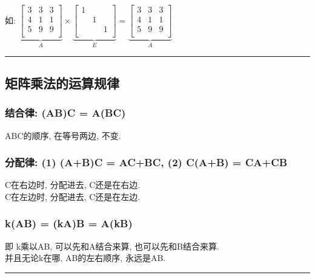 \documentclass[UTF8]{ctexart}
\begin{document}
如: $
\underset{A}{\underbrace{\left[ \begin{matrix}
			3&		3&		3\\
			4&		1&		1\\
			5&		9&		9\\
		\end{matrix} \right] }}×\underset{E}{\underbrace{\left[ \begin{matrix}
			1&		&		\\
			&		1&		\\
			&		&		1\\
		\end{matrix} \right] }}=\underset{A}{\underbrace{\left[ \begin{matrix}
			3&		3&		3\\
			4&		1&		1\\
			5&		9&		9\\
		\end{matrix} \right] }}
$\\

\hrule

\subsection{矩阵乘法的运算规律}

\subsubsection{结合律: (AB)C = A(BC)} 

ABC的顺序, 在等号两边, 不变.\\


\subsubsection{分配律: (1) (A+B)C = AC+BC,  (2) C(A+B) = CA+CB} 

C在右边时, 分配进去, C还是在右边. \\
C在左边时, 分配进去, C还是在左边. \\


\subsubsection{ k(AB) = (kA)B = A(kB)} 

即 k乘以AB, 可以先和A结合来算, 也可以先和B结合来算. \\
并且无论k在哪, AB的左右顺序, 永远是AB. \\


\hrule
\end{document}
